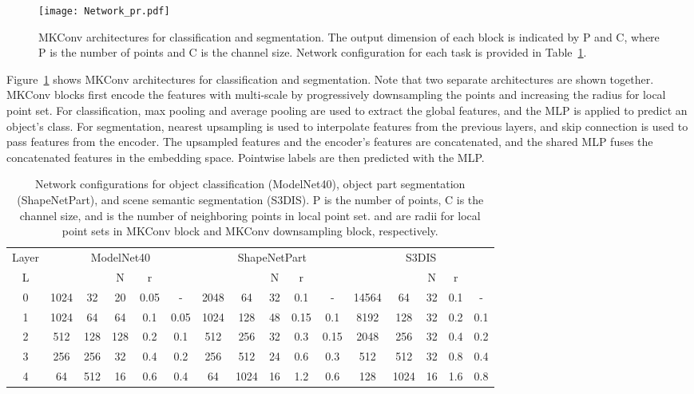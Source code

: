 \documentclass[preprint,12pt]{elsarticle}
\begin{document}
\begin{figure}[t]
\centering
\texttt{[image: Network\_pr.pdf]}
\vspace{-0.5cm}
\caption{MKConv architectures for classification and segmentation. The output dimension of each block is indicated by P and C, where P is the number of points and C is the channel size. Network configuration for each task is provided in Table~\ref{tab:config}.}
\vspace{0.3cm}
\label{fig:net}
\end{figure}
Figure~\ref{fig:net} shows MKConv architectures for classification and segmentation. Note that two separate architectures are shown together. MKConv blocks first encode the features with multi-scale by progressively downsampling the points and increasing the radius for local point set. For classification, max pooling and average pooling are used to extract the global features, and the MLP is applied to predict an object's class. For segmentation, nearest upsampling is used to interpolate features from the previous layers, and skip connection is used to pass features from the encoder. The upsampled features and the encoder's features are concatenated, and the shared MLP fuses the concatenated features in the embedding space. Pointwise labels are then predicted with the MLP.

\begin{table}[t]
\caption{Network configurations for object classification (ModelNet40), object part segmentation (ShapeNetPart), and scene semantic segmentation (S3DIS). P is the number of points, C is the channel size, and  is the number of neighboring points in local point set.  and  are radii for local point sets in MKConv block and MKConv downsampling block, respectively.}
\vspace{-0.3cm}
\begin{center}
	\setlength\tabcolsep{2.8pt}
	\small
	\begin{tabular}{c|ccccc|ccccc|ccccc}
		\toprule
		Layer & \multicolumn{5}{c|}{ModelNet40} & \multicolumn{5}{c|}{ShapeNetPart} & \multicolumn{5}{c}{S3DIS} \\
		L  &  &  & N & r & & &  & N & r & &  & & N & r & \\	
		\midrule
		\midrule
		0 &1024 & 32& 20 & 0.05 &  - &2048  &64 & 32&0.1 & -& 14564&64& 32 &0.1&-\\
		1 &1024& 64 & 64 & 0.1 & 0.05 &1024 & 128 & 48&0.15 & 0.1& 8192&128&32 &0.2&0.1\\
		2 & 512 & 128 & 128 & 0.2 & 0.1 &512 & 256 & 32&0.3 & 0.15& 2048&256&32&0.4&0.2\\
		3 & 256 & 256 &32 & 0.4 &  0.2 &256 & 512 & 24&0.6 & 0.3& 512&512&32&0.8&0.4\\
		4 & 64 & 512 & 16 & 0.6 & 0.4 & 64 & 1024 & 16& 1.2 &0.6 & 128 & 1024&16&1.6&0.8\\
		\bottomrule
	\end{tabular}
	\label{tab:config}
\end{center}
\end{table}
\end{document}
